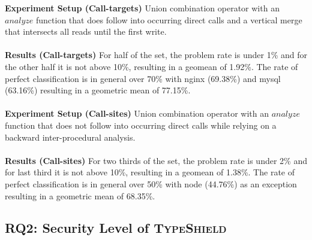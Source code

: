 \textbf{Experiment Setup (Call-targets)}
{Union combination operator with an $analyze$ function that does follow into occurring direct calls  and a vertical merge that intersects all reads until the first write.
}\\~\\
\textbf{Results (Call-targets)}{
For half of the set, the problem rate is under 1\% and for the other half it is not above 10\%, resulting in a geomean of 1.92\%. The rate of perfect classification is in general over 70\% with nginx (69.38\%) and mysql (63.16\%)  resulting in a geometric mean of 77.15\%.
}\\~\\
\textbf{Experiment Setup (Call-sites)}
{ Union combination operator with an $analyze$ function that does not follow into occurring direct calls while relying on a backward inter-procedural analysis.
}\\~\\
\textbf{Results (Call-sites)} {
For two thirds of the set, the problem rate is under 2\% and for last third it is not above 10\%, resulting in a geomean of 1.38\%.  The rate of perfect classification is in general over 50\% with node (44.76\%) as an exception resulting in a geometric mean of 68.35\%.}


%
%
%
%
\subsection{RQ2: Security Level of \textsc{TypeShield}}
\label{section:typeshieldeffectiveness}

